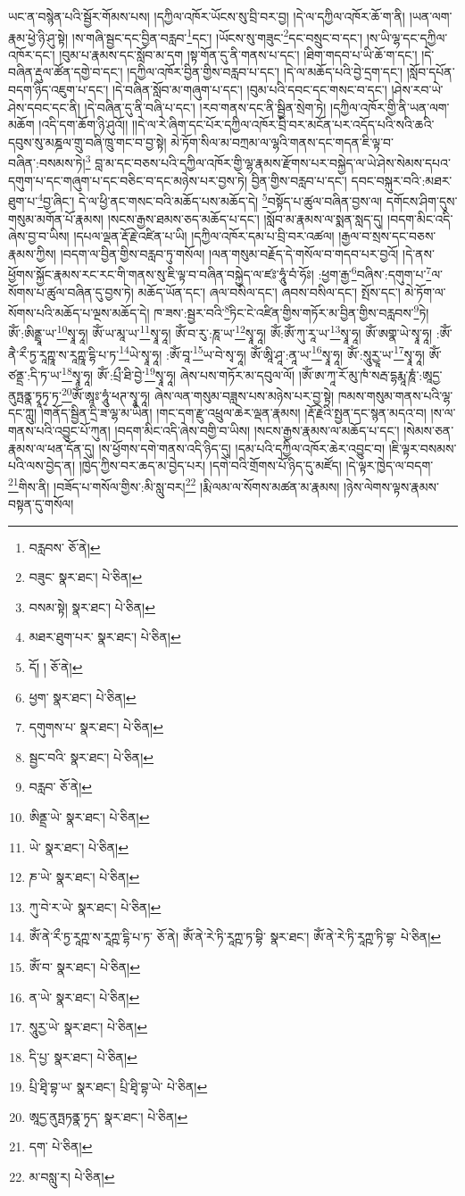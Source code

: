 ཡང་ན་བསྙེན་པའི་སྦྱོར་གོམས་པས། །དཀྱིལ་འཁོར་ཡོངས་སུ་བྲི་བར་བྱ། །དེ་ལ་དཀྱིལ་འཁོར་ཆོ་ག་ནི། །ཡན་ལག་རྣམ་ཕྱེ་ཉི་ཤུ་སྟེ། །ས་གཞི་སྦྱང་དང་བྱིན་བརླབ་\footnote{བརླབས་  ཅོ་ནེ། }དང་། །ཡོངས་སུ་གཟུང་\footnote{བཟུང་  སྣར་ཐང་།  པེ་ཅིན། }དང་བསྲུང་བ་དང་། །ས་ཡི་ལྷ་དང་དཀྱིལ་འཁོར་དང་། །བུམ་པ་རྣམས་དང་སློབ་མ་དག །སྟ་གོན་དུ་ནི་གནས་པ་དང་། །ཐིག་གདབ་པ་ཡི་ཆོ་ག་དང་། །དེ་བཞིན་རྡུལ་ཚོན་དགྱེ་བ་དང་། །དཀྱིལ་འཁོར་བྱིན་གྱིས་བརླབ་པ་དང་། །དེ་ལ་མཆོད་པའི་བྱེ་དྲག་དང་། །སློབ་དཔོན་བདག་ཉིད་འཇུག་པ་དང་། །དེ་བཞིན་སློབ་མ་གཞུག་པ་དང་། །བུམ་པའི་དབང་དང་གསང་བ་དང་། །ཤེས་རབ་ཡེ་ཤེས་དབང་དང་ནི། །དེ་བཞིན་དུ་ནི་བཞི་པ་དང་། །རབ་གནས་དང་ནི་སྦྱིན་སྲེག་ཏེ། །དཀྱིལ་འཁོར་གྱི་ནི་ཡན་ལག་མཆོག །འདི་དག་ཆོག་ཉི་ཤུའོ།། །།དེ་ལ་རེ་ཞིག་དང་པོར་དཀྱིལ་འཁོར་བྲི་བར་མངོན་པར་འདོད་པའི་སའི་ཆའི་དབུས་སུ་མཎྜལ་གྲུ་བཞི་ཁྲུ་གང་བ་བྱ་སྟེ། མེ་ཏོག་སིལ་མ་བཀྲམ་ལ་ལྷའི་གནས་དང་གདན་ཇི་ལྟ་བ་བཞིན་:བསམས་ཏེ།\footnote{བསམ་སྟེ།  སྣར་ཐང་།  པེ་ཅིན། } བླ་མ་དང་བཅས་པའི་དཀྱིལ་འཁོར་གྱི་ལྷ་རྣམས་རྫོགས་པར་བསྐྱེད་ལ་ཡེ་ཤེས་སེམས་དཔའ་དགུག་པ་དང་གཞུག་པ་དང་བཅིང་བ་དང་མཉེས་པར་བྱས་ཏེ། བྱིན་གྱིས་བརླབ་པ་དང་། དབང་བསྐུར་བའི་:མཐར་ཐུག་པ་\footnote{མཐར་ཐུག་པར་  སྣར་ཐང་།  པེ་ཅིན། }བྱ་ཞིང་། དེ་ལ་ཕྱི་ནང་གསང་བའི་མཆོད་པས་མཆོད་དེ། \footnote{དོ། །   ཅོ་ནེ། }བསྟོད་པ་ཚུལ་བཞིན་བྱས་ལ། དགོངས་ཤིག་དུས་གསུམ་མགོན་པོ་རྣམས། །སངས་རྒྱས་ཐམས་ཅད་མཆོད་པ་དང་། །སློབ་མ་རྣམས་ལ་སྨན་སླད་དུ། །བདག་མིང་འདི་ཞེས་བྱ་བ་ཡིས། །དཔལ་ལྡན་རྡོ་རྗེ་འཛིན་པ་ཡི། །དཀྱིལ་འཁོར་དམ་པ་བྲི་བར་འཚལ། །རྒྱལ་བ་སྲས་དང་བཅས་རྣམས་ཀྱིས། །བདག་ལ་བྱིན་གྱིས་བརླབ་ཏུ་གསོལ། །ལན་གསུམ་བརྗོད་དེ་གསོལ་བ་གདབ་པར་བྱའོ། །དེ་ནས་ཕྱོགས་སྐྱོང་རྣམས་རང་རང་གི་གནས་སུ་ཇི་ལྟ་བ་བཞིན་བསྐྱེད་ལ་ཛཿ་ཧཱུཾ་བཾ་ཧོཿ། :ཕྱག་རྒྱ་\footnote{ཕྱག་  སྣར་ཐང་།  པེ་ཅིན། }བཞིས་:དགུག་པ་\footnote{དགུགས་པ་  སྣར་ཐང་།  པེ་ཅིན། }ལ་སོགས་པ་ཚུལ་བཞིན་དུ་བྱས་ཏེ། མཆོད་ཡོན་དང་། ཞལ་བསིལ་དང་། ཞབས་བསིལ་དང་། སྤོས་དང་། མེ་ཏོག་ལ་སོགས་པའི་མཆོད་པ་ལྔས་མཆོད་དེ། ཁ་ཟས་:སྦྱར་བའི་\footnote{སྦྱང་བའི་  སྣར་ཐང་།  པེ་ཅིན། }ཏིང་ངེ་འཛིན་གྱིས་གཏོར་མ་བྱིན་གྱིས་བརླབས་\footnote{བརླབ་  ཅོ་ནེ། }ཏེ། ཨོཾ་:ཨིནྡྲཱ་ཡ་\footnote{ཨིནྡྲ་ཡེ་  སྣར་ཐང་།  པེ་ཅིན། }སྭཱ་ཧཱ། ཨོཾ་ཡ་མཱ་ཡ་\footnote{ཡེ་  སྣར་ཐང་།  པེ་ཅིན། }སྭཱ་ཧཱ། ཨོཾ་བ་རུ་:ཎཱ་ཡ་\footnote{ཎ་ཡེ་  སྣར་ཐང་།  པེ་ཅིན། }སྭཱ་ཧཱ། ཨོཾ:ཨོཾ་ཀུ་རཱ་ཡ་\footnote{ཀུ་བེ་ར་ཡེ་  སྣར་ཐང་།  པེ་ཅིན། }སྭཱ་ཧཱ། ཨོཾ་ཨགྣ་ཡེ་སྭཱ་ཧཱ། :ཨོཾ་ནཻ་རྀ་ཏྱ་རཱཀྵཱ་ས་རཱཀྵཱ་དྷི་པ་ཏ་\footnote{ཨོཾ་ནེ་རྀ་ཏྱ་རཱཀྵ་ས་རཱཀྵ་དྷི་པ་ཏ་  ཅོ་ནེ། ཨོཾ་ནེ་རེ་ཏི་རཱཀྵ་ཏ་བྷི་  སྣར་ཐང་། ཨོཾ་ནེ་རེ་ཏི་རཱཀྵ་ཏི་བྷ་  པེ་ཅིན། }ཡེ་སྭཱ་ཧཱ། :ཨོཾ་བཱ་\footnote{ཨོཾ་བ་  སྣར་ཐང་།  པེ་ཅིན། }ཡ་བེ་སྭ་ཧཱ། ཨོཾ་ཨཱི་ཤཱ་:ནཱ་ཡ་\footnote{ན་ཡེ་  སྣར་ཐང་།  པེ་ཅིན། }སྭཱ་ཧཱ། ཨོཾ་:སཱུརྱཱ་ཡ་\footnote{སཱུརྱ་ཡེ་  སྣར་ཐང་།  པེ་ཅིན། }སྭཱ་ཧཱ། ཨོཾ་ཙནྡྲ་:དི་ཏ་ཡ་\footnote{དི་པྱ་  སྣར་ཐང་།  པེ་ཅིན། }སྭཱ་ཧཱ། ཨོཾ་:པྲྀ་ཐི་བྱེ་\footnote{པྲི་ཐྭི་བྷ་ཡ་  སྣར་ཐང་། པྲི་ཐྭི་བྷ་ཡེ་  པེ་ཅིན། }སྭཱ་ཧཱ། ཞེས་པས་གཏོར་མ་དབུལ་ལོ། །ཨོཾ་ཨ་ཀཱ་རོ་མུ་ཁཾ་སརྦ་དྷརྨཱ་ཎཱཾ་:ཨཱདྱ་ནུཏྤནྣ་ཏྭཱཏྭ་ཏ་\footnote{ཨཱདྱ་ནུཏྤཏནྣ་ཏྭད་  སྣར་ཐང་།  པེ་ཅིན། }ཨོཾ་ཨཱཿ་ཧཱུཾ་ཕཊ་སྭཱ་ཧཱ། ཞེས་ལན་གསུམ་བཟླས་པས་མཉེས་པར་བྱ་སྟེ། ཁམས་གསུམ་གནས་པའི་ལྷ་དང་ཀླུ། །གནོད་སྦྱིན་དྲི་ཟ་ལྷ་མ་ཡིན། །གང་དག་རྫུ་འཕྲུལ་ཆེར་ལྡན་རྣམས། །རྡོ་རྗེའི་སྤྱན་དང་སྙན་མདའ་བ། །ས་ལ་གནས་པའི་འབྱུང་པོ་ཀུན། །བདག་མིང་འདི་ཞེས་བགྱི་བ་ཡིས། །སངས་རྒྱས་རྣམས་ལ་མཆོད་པ་དང་། །སེམས་ཅན་རྣམས་ལ་ཕན་དོན་དུ། །ས་ཕྱོགས་དགེ་གནས་འདི་ཉིད་དུ། །དམ་པའི་དཀྱིལ་འཁོར་ཆེར་འབྱུང་བ། །ཇི་ལྟར་བསམས་པའི་ལས་བྱེད་ན། །ཁྱེད་ཀྱིས་བར་ཆད་མ་བྱེད་པར། །དགེ་བའི་གྲོགས་པོ་ཉིད་དུ་མཛོད། །དེ་ལྟར་ཁྱེད་ལ་བདག་\footnote{དག་  པེ་ཅིན། }གིས་ནི། །བཟོད་པ་གསོལ་གྱིས་:མི་སླུ་བར།\footnote{མ་བསླུ་ར།  པེ་ཅིན། } །རྨི་ལམ་ལ་སོགས་མཚན་མ་རྣམས། །ཉེས་ལེགས་ལྟས་རྣམས་བསྟན་དུ་གསོལ། 